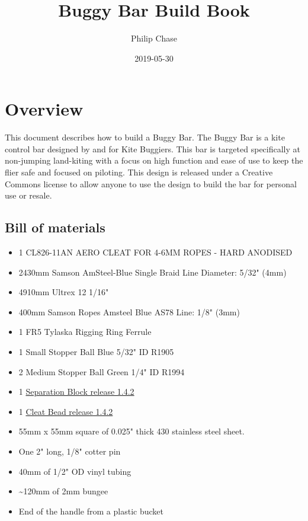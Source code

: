 \documentclass[]{book}
\title{Buggy Bar Build Book}
\author{Philip Chase}
\date{2019-05-30}
\providecommand{\tightlist}{%
  \setlength{\itemsep}{0pt}\setlength{\parskip}{0pt}}
\begin{document}
\maketitle

{
\setcounter{tocdepth}{1}
\tableofcontents
}
\hypertarget{overview}{%
\chapter{Overview}\label{overview}}

This document describes how to build a Buggy Bar. The Buggy Bar is a kite control bar designed by and for Kite Buggiers. This bar is targeted specifically at non-jumping land-kiting with a focus on high function and ease of use to keep the flier safe and focused on piloting. This design is released under a Creative Commons license to allow anyone to use the design to build the bar for personal use or resale.

\hypertarget{bill-of-materials}{%
\section{Bill of materials}\label{bill-of-materials}}

\begin{itemize}
\tightlist
\item
  1 CL826-11AN AERO CLEAT FOR 4-6MM ROPES - HARD ANODISED
\item
  2430mm Samson AmSteel-Blue Single Braid Line Diameter: 5/32" (4mm)
\item
  4910mm Ultrex 12 1/16"
\item
  400mm Samson Ropes Amsteel Blue AS78 Line: 1/8" (3mm)
\item
  1 FR5 Tylaska Rigging Ring Ferrule
\item
  1 Small Stopper Ball Blue 5/32" ID R1905
\item
  2 Medium Stopper Ball Green 1/4" ID R1994
\item
  1 \href{https://github.com/pbchase/kite_bar_parts/blob/1.4.2/printable/separation_block_v1_9a972b6.stl}{Separation Block release 1.4.2}
\item
  1 \href{https://github.com/pbchase/kite_bar_parts/blob/1.4.2/printable/cleat_bead_ff7e41a.stl}{Cleat Bead release 1.4.2}
\item
  55mm x 55mm square of 0.025" thick 430 stainless steel sheet.
\item
  One 2" long, 1/8" cotter pin
\item
  40mm of 1/2" OD vinyl tubing
\item
  \textasciitilde{}120mm of 2mm bungee
\item
  End of the handle from a plastic bucket
\end{itemize}
\end{document}
